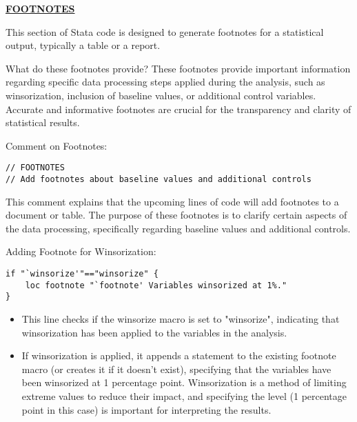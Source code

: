 \documentclass{article}
\begin{document}
\underline{\textbf{FOOTNOTES}}

\vspace{0.3cm}This section of Stata code is designed to generate footnotes for a statistical output, typically a table or a report. \newline

What do these footnotes provide?
These footnotes provide important information regarding specific data processing steps applied during the analysis, such as winsorization, inclusion of baseline values, or additional control variables. Accurate and informative footnotes are crucial for the transparency and clarity of statistical results. \newline

Comment on Footnotes:
\begin{mdframed}
\begin{verbatim}
// FOOTNOTES 
// Add footnotes about baseline values and additional controls
\end{verbatim}
\end{mdframed}

\vspace{0.3cm} This comment explains that the upcoming lines of code will add footnotes to a document or table. The purpose of these footnotes is to clarify certain aspects of the data processing, specifically regarding baseline values and additional controls.\newline

Adding Footnote for Winsorization:

\begin{mdframed}
\begin{verbatim}
if "`winsorize'"=="winsorize" {
    loc footnote "`footnote' Variables winsorized at 1%."
}
\end{verbatim}
\end{mdframed}

\begin{itemize}
    \item This line checks if the winsorize macro is set to "winsorize", indicating that winsorization has been applied to the variables in the analysis.
    \item If winsorization is applied, it appends a statement to the existing footnote macro (or creates it if it doesn't exist), specifying that the variables have been winsorized at 1 percentage point. Winsorization is a method of limiting extreme values to reduce their impact, and specifying the level (1 percentage point in this case) is important for interpreting the results.
\end{itemize}
\end{document}
